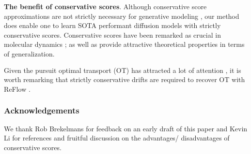 \textbf{The benefit of conservative scores}. Although conservative score approximations are not strictly necessary for generative modeling \citep{horvat2024gauge}, our method does enable one to learn SOTA performant diffusion models with strictly conservative scores. Conservative scores have been remarked as crucial in molecular dynamics \citep{arts2023two}; as well as provide attractive theoretical properties \citep{daras2024consistent} in terms of generalization. 

Given the pursuit optimal transport (OT) has attracted a lot of attention \citep{debortoli2021diffusion, thornton2022riemannian, liu20232, shi2023diffusion}, it is worth remarking that strictly conservative drifts are required to recover OT with ReFlow \citep{liu2022rectified}.

\subsubsection*{Acknowledgements}
We thank Rob Brekelmans for feedback on an early draft of this paper and Kevin Li for references \citep{horvat2024gauge, wenliang2020blindness} and fruitful discussion on the advantages/ disadvantages of conservative scores.